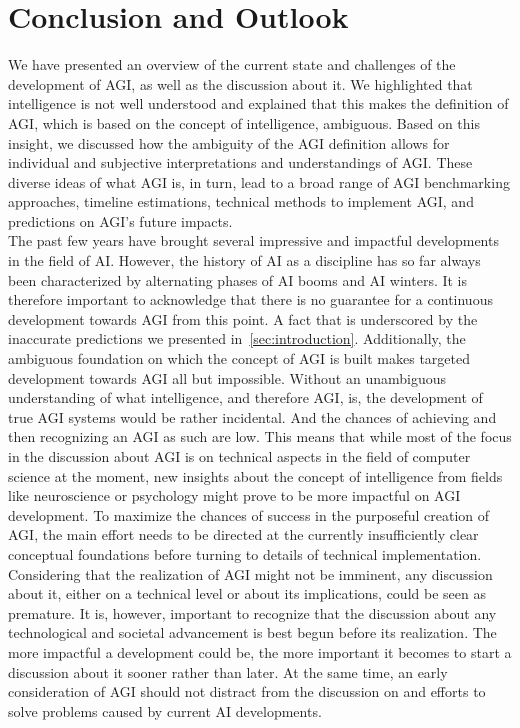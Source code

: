 \section{Conclusion and Outlook}\label{sec:conclusion}
We have presented an overview of the current state and challenges of the development of AGI, as well as the discussion about it.
We highlighted that intelligence is not well understood and explained that this makes the definition of AGI, which is based on the concept of intelligence, ambiguous.
Based on this insight, we discussed how the ambiguity of the AGI definition allows for individual and subjective interpretations and understandings of AGI.
These diverse ideas of what AGI is, in turn, lead to a broad range of AGI benchmarking approaches, timeline estimations, technical methods to implement AGI, and predictions on AGI's future impacts.\\

The past few years have brought several impressive and impactful developments in the field of AI.
However, the history of AI as a discipline has so far always been characterized by alternating phases of AI booms and AI winters.
It is therefore important to acknowledge that there is no guarantee for a continuous development towards AGI from this point.
A fact that is underscored by the inaccurate predictions we presented in~\cref{sec:introduction}.
Additionally, the ambiguous foundation on which the concept of AGI is built makes targeted development towards AGI all but impossible.
Without an unambiguous understanding of what intelligence, and therefore AGI, is, the development of true AGI systems would be rather incidental.
And the chances of achieving and then recognizing an AGI as such are low.
This means that while most of the focus in the discussion about AGI is on technical aspects in the field of computer science at the moment, new insights about the concept of intelligence from fields like neuroscience or psychology might prove to be more impactful on AGI development.
To maximize the chances of success in the purposeful creation of AGI, the main effort needs to be directed at the currently insufficiently clear conceptual foundations before turning to details of technical implementation.\\

Considering that the realization of AGI might not be imminent, any discussion about it, either on a technical level or about its implications, could be seen as premature.
It is, however, important to recognize that the discussion about any technological and societal advancement is best begun before its realization.
The more impactful a development could be, the more important it becomes to start a discussion about it sooner rather than later.
At the same time, an early consideration of AGI should not distract from the discussion on and efforts to solve problems caused by current AI developments.